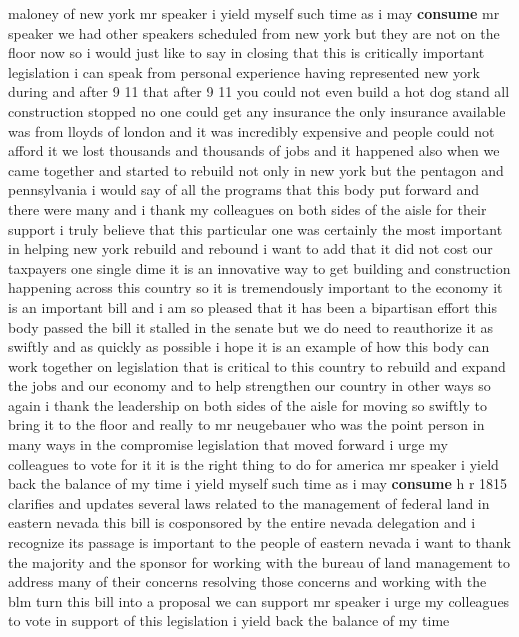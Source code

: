 \documentclass{article}
\begin{document}
\vspace{8mm}
maloney of new york mr speaker i yield myself such time as i may {\bf \color{red} consume} mr speaker we had other speakers scheduled from new york but they are not on the floor now so i would just like to say in closing that this is critically important legislation i can speak from personal experience having represented new york during and after 9 11 that after 9 11 you could not even build a hot dog stand all construction stopped no one could get any insurance the only insurance available was from lloyds of london and it was incredibly expensive and people could not afford it we lost thousands and thousands of jobs and it happened also when we came together and started to rebuild not only in new york but the pentagon and pennsylvania i would say of all the programs that this body put forward and there were many and i thank my colleagues on both sides of the aisle for their support i truly believe that this particular one was certainly the most important in helping new york rebuild and rebound i want to add that it did not cost our taxpayers one single dime it is an innovative way to get building and construction happening across this country so it is tremendously important to the economy it is an important bill and i am so pleased that it has been a bipartisan effort this body passed the bill it stalled in the senate but we do need to reauthorize it as swiftly and as quickly as possible i hope it is an example of how this body can work together on legislation that is critical to this country to rebuild and expand the jobs and our economy and to help strengthen our country in other ways so again i thank the leadership on both sides of the aisle for moving so swiftly to bring it to the floor and really to mr neugebauer who was the point person in many ways in the compromise legislation that moved forward i urge my colleagues to vote for it it is the right thing to do for america mr speaker i yield back the balance of my time
\vspace{8mm}
i yield myself such time as i may {\bf \color{red} consume} h r 1815 clarifies and updates several laws related to the management of federal land in eastern nevada this bill is cosponsored by the entire nevada delegation and i recognize its passage is important to the people of eastern nevada i want to thank the majority and the sponsor for working with the bureau of land management to address many of their concerns resolving those concerns and working with the blm turn this bill into a proposal we can support mr speaker i urge my colleagues to vote in support of this legislation i yield back the balance of my time\pagebreak
\end{document}
